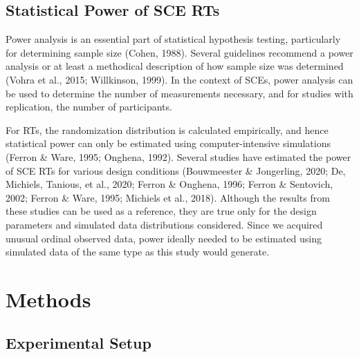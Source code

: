 \documentclass{article}
\begin{document}
\subsection{Statistical Power of SCE RTs }

Power analysis is an essential part of statistical hypothesis testing, particularly for determining sample size (Cohen, 1988). Several guidelines recommend a power analysis or at least a methodical description of how sample size was determined (Vohra et al., 2015; Willkinson, 1999). In the context of SCEs, power analysis can be used to determine the number of measurements necessary, and for studies with replication, the number of participants.

For RTs, the randomization distribution is calculated empirically, and hence statistical power can only be estimated using computer-intensive simulations (Ferron \& Ware, 1995; Onghena, 1992). Several studies have estimated the power of SCE RTs for various design conditions (Bouwmeester \& Jongerling, 2020; De, Michiels, Tanious, et al., 2020; Ferron \& Onghena, 1996; Ferron \& Sentovich, 2002; Ferron \& Ware, 1995; Michiels et al., 2018). Although the results from these studies can be used as a reference, they are true only for the design parameters and simulated data distributions considered. Since we acquired unusual ordinal observed data, power ideally needed to be estimated using simulated data of the same type as this study would generate.

\section{Methods}

\subsection{Experimental Setup}
\end{document}
